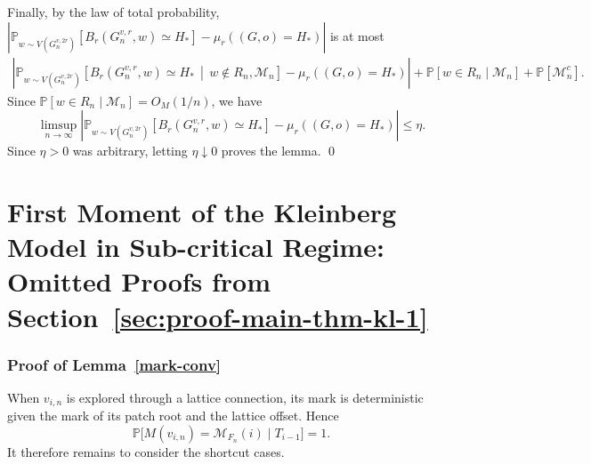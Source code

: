 \documentclass[10pt]{amsart}
\begin{document}
Finally, by the law of total probability, $\left|
\mathbb P_{w\sim V(G_n^{v,2r})}\!\left[
B_r(G_n^{v,r},w)\simeq H_*
\right]
-
\mu_r((G,o)=H_*)
\right| $ is at most 
\begin{align*}
\left|
\mathbb P_{w\sim V(G_n^{v,2r})}\!\left[
B_r(G_n^{v,r},w)\simeq H_* \,\middle|\,  w \notin R_n, \mathcal M_n
\right]
-
\mu_r((G,o)=H_*)
\right|
 + \mathbb P[ w \in R_n \mid \mathcal M_n] +
\mathbb P[\mathcal M_n^c].
\end{align*}
Since $\mathbb P[ w \in R_n \mid \mathcal M_n] = O_M(1/n)$, we have
\[
\limsup_{n\to\infty}
\left|
\mathbb P_{w\sim V(G_n^{v,2r})}\!\left[
B_r(G_n^{v,r},w)\simeq H_*
\right]
-
\mu_r((G,o)=H_*)
\right|
\le \eta .
\]
Since \(\eta>0\) was arbitrary, letting \(\eta\downarrow0\) proves the lemma.
\qed

\section{First Moment of the Kleinberg Model in Sub-critical Regime: \\ Omitted Proofs from Section~\ref{sec:proof-main-thm-kl-1}} \label{proof-kl-1moment}

\subsubsection*{Proof of Lemma~\ref{mark-conv}}

When $v_{i,n}$ is explored through a lattice connection, its mark is
deterministic given the mark of its patch root and the lattice offset. Hence
\[
\mathbb P\big[M(v_{i,n})=\mathcal M_{F_n}(i)\mid T_{i-1}\big]=1.
\]
It therefore remains to consider the shortcut cases.
\end{document}
